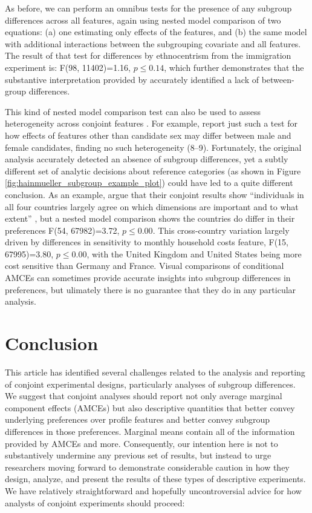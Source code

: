 \documentclass[a4paper,12pt]{article}\usepackage[]{graphicx}\usepackage[]{color}
\begin{document}
As before, we can perform an omnibus tests for the presence of any subgroup differences across all features, again using nested model comparison of two equations: (a) one estimating only effects of the features, and (b) the same model with additional interactions between the subgrouping covariate and all features. The result of that test for differences by ethnocentrism from the immigration experiment is: F(98, 11402)=1.16, $p\leq0.14$, which further demonstrates that the substantive interpretation provided by \citet{HainmuellerHopkinsYamamoto2014} accurately identified a lack of between-group differences.

This kind of nested model comparison test can also be used to assess heterogeneity across conjoint features \citep[see also][]{EgamiImai2018}. For example, \citet{TeeleKallaRosenbluth2018} report just such a test for how effects of features other than candidate sex may differ between male and female candidates, finding no such heterogeneity (8--9). Fortunately, the original analysis accurately detected an absence of subgroup differences, yet a subtly different set of analytic decisions about reference categories (as shown in Figure \ref{fig:hainmueller_subgroup_example_plot}) could have led to a quite different conclusion. As an example, \citet{BechtelScheve2013} argue that their conjoint results show ``individuals in all four countries largely agree on which dimensions are important and to what extent'' \citep[13765]{BechtelScheve2013}, but a nested model comparison shows the countries do differ in their preferences F(54, 67982)=3.72, $p\leq0.00$. This cross-country variation largely driven by differences in sensitivity to monthly household costs feature, F(15, 67995)=3.80, $p\leq0.00$, with the United Kingdom and United States being more cost sensitive than Germany and France. Visual comparisons of conditional AMCEs can sometimes provide accurate insights into subgroup differences in preferences, but ulimately there is no guarantee that they do in any particular analysis.

\section*{Conclusion}\label{sec:conclusion}

This article has identified several challenges related to the analysis and reporting of conjoint experimental designs, particularly analyses of subgroup differences. We suggest that conjoint analyses should report not only average marginal component effects (AMCEs) but also descriptive quantities that better convey underlying preferences over profile features and better convey subgroup differences in those preferences. Marginal means contain all of the information provided by AMCEs and more. Consequently, our intention here is not to substantively undermine any previous set of results, but instead to urge researchers moving forward to demonstrate considerable caution in how they design, analyze, and present the results of these types of descriptive experiments. We have relatively straightforward and hopefully uncontroversial advice for how analysts of conjoint experiments should proceed:
\end{document}
